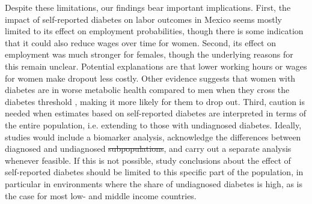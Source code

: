 \documentclass[12pt,english]{article}
\providecommand{\DIFaddtex}[1]{{\protect\color{blue}\uwave{#1}}} %
\providecommand{\DIFdeltex}[1]{{\protect\color{red}\sout{#1}}}                      %
\providecommand{\DIFaddbegin}{} %
\providecommand{\DIFaddend}{} %
\providecommand{\DIFdelbegin}{} %
\providecommand{\DIFdelend}{} %
\providecommand{\DIFadd}[1]{\texorpdfstring{\DIFaddtex{#1}}{#1}} %
\providecommand{\DIFdel}[1]{\texorpdfstring{\DIFdeltex{#1}}{}} %
\begin{document}
Despite these limitations, our findings bear important implications. First, the impact of self-reported diabetes on labor outcomes in Mexico seems mostly limited to its effect on employment probabilities, though there is some indication that it could also reduce wages over time for women.  Second, its effect on employment was much stronger for females, though the underlying reasons for this remain unclear. Potential explanations are that lower working hours or wages for women make \DIFaddbegin \DIFadd{a }\DIFaddend dropout less costly. Other evidence suggests that women with diabetes are in worse metabolic health compared to men when they cross the diabetes threshold \parencite{Peters2015}, making it more likely for them to drop out. Third, caution is needed when estimates based on self-reported diabetes are interpreted in terms of the entire population, i.e. extending to those with undiagnosed diabetes. Ideally, studies would  include a biomarker analysis, acknowledge the differences between diagnosed and undiagnosed \DIFdelbegin \DIFdel{subpopulations}\DIFdelend \DIFaddbegin \DIFadd{sub-populations}\DIFaddend , and carry out a separate analysis whenever feasible. If this is not possible, study conclusions about the effect of self-reported diabetes should be limited to this specific part of the population, in particular in environments where the share of undiagnosed diabetes is high, as is the case for most low- and middle income countries.
\end{document}
